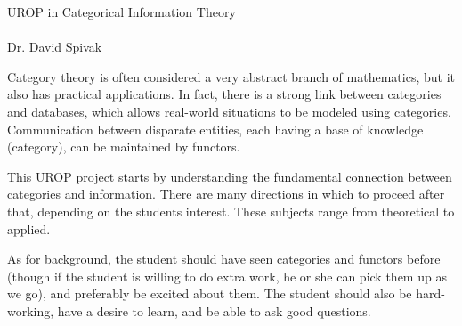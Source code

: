 \documentclass[12pt]{letter}
\begin{document}
\Large\begin{center} UROP in Categorical Information Theory\\~\\\large Dr. David Spivak\end{center}\normalsize

\vspace{.5in}

Category theory is often considered a very abstract branch of mathematics, but it also has practical applications. In fact, there is a strong link between categories and databases, which allows real-world situations to be modeled using categories. Communication between disparate entities, each having a base of knowledge (category), can be maintained by functors. 

This UROP project starts by understanding the fundamental connection between categories and information. There are many directions in which to proceed after that, depending on the students interest. These subjects range from theoretical to applied.

As for background, the student should have seen categories and functors before (though if the student is willing to do extra work, he or she can pick them up as we go), and preferably be excited about them. The student should also be hard-working, have a desire to learn, and be able to ask good questions.
\end{document}
